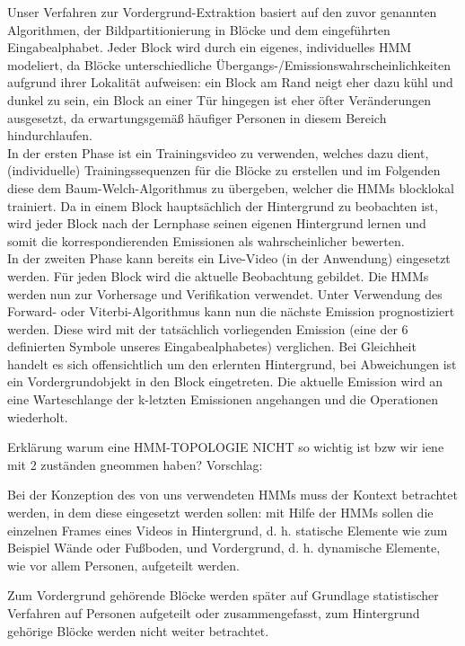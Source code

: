 Unser Verfahren zur Vordergrund-Extraktion basiert auf den zuvor genannten  Algorithmen, der Bildpartitionierung in Blöcke und dem eingeführten Eingabealphabet.
Jeder Block wird durch ein eigenes, individuelles HMM modeliert, da Blöcke unterschiedliche Übergangs-/Emissionswahrscheinlichkeiten aufgrund ihrer Lokalität aufweisen: ein Block am Rand neigt eher dazu kühl und dunkel zu sein, ein Block an einer Tür hingegen ist eher öfter Veränderungen ausgesetzt, da erwartungsgemäß häufiger Personen in diesem Bereich hindurchlaufen.\\
In der ersten Phase ist ein Trainingsvideo zu verwenden, welches dazu dient, (individuelle) Trainingssequenzen für die Blöcke zu erstellen und im Folgenden diese dem Baum-Welch-Algorithmus zu übergeben, welcher die HMMs blocklokal trainiert.
 Da in einem Block hauptsächlich der Hintergrund zu beobachten ist, wird jeder Block nach der Lernphase seinen eigenen Hintergrund lernen und somit die korrespondierenden Emissionen als wahrscheinlicher bewerten.\\
 In der zweiten Phase kann bereits ein Live-Video (in der Anwendung) eingesetzt werden.
 Für jeden Block wird die aktuelle Beobachtung gebildet.
 Die HMMs werden nun zur Vorhersage und Verifikation verwendet.
 Unter Verwendung des Forward- oder Viterbi-Algorithmus kann nun die nächste Emission prognostiziert werden.
 Diese wird mit der tatsächlich vorliegenden Emission (eine der 6 definierten Symbole unseres Eingabealphabetes) verglichen.
 Bei Gleichheit handelt es sich offensichtlich um den erlernten Hintergrund, bei Abweichungen ist ein Vordergrundobjekt in den Block eingetreten.
 Die aktuelle Emission wird an eine Warteschlange der k-letzten Emissionen angehangen und die Operationen wiederholt.


Erklärung warum eine HMM-TOPOLOGIE NICHT so wichtig ist bzw wir iene mit 2 zuständen gneommen haben?
Vorschlag:

Bei der Konzeption des von uns verwendeten HMMs muss der Kontext betrachtet werden, in dem diese eingesetzt werden sollen: mit Hilfe der HMMs sollen die einzelnen  Frames eines Videos in Hintergrund, d.
h.
 statische Elemente wie zum Beispiel Wände oder Fußboden, und Vordergrund, d.
h.
 dynamische Elemente, wie vor allem Personen, aufgeteilt werden.

Zum Vordergrund gehörende Blöcke werden später auf Grundlage statistischer Verfahren auf Personen aufgeteilt oder zusammengefasst, zum Hintergrund gehörige Blöcke werden nicht weiter betrachtet.

